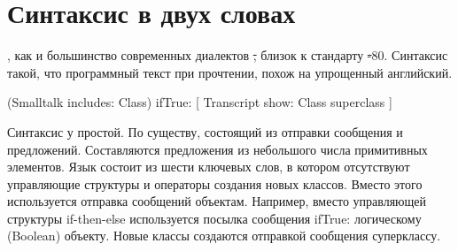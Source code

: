 \documentclass[a4paper,10pt,twoside]{book}
\begin{document}
	\renewcommand{\nnbb}[2]{} %
	\sloppy
\fi
\chapter{Синтаксис в двух словах}




\pharo, как и большинство современных диалектов \st, близок к стандарту \st-80. Синтаксис такой,
что программный текст при прочтении, похож на упрощенный английский.

\begin{code}{}
(Smalltalk includes: Class) ifTrue: [ Transcript show: Class superclass ]
\end{code}

\noindent

Синтаксис у \pharo простой. По существу, состоящий из отправки сообщения и предложений. Составляются предложения из небольшого числа примитивных элементов.
Язык состоит из шести ключевых слов, в котором отсутствуют управляющие структуры и операторы создания новых классов.
Вместо этого используется отправка сообщений объектам.
Например, вместо управляющей структуры if-then-else используется посылка сообщения ifTrue: логическому (Boolean) объекту.
Новые классы создаются отправкой сообщения суперклассу.
\end{document}
